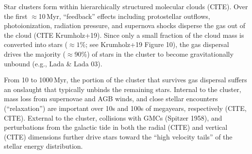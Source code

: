 \documentclass[12pt,twocolumn,tighten]{aastex63}
\begin{document}
Star clusters form within hierarchically structured molecular clouds
(CITE).  Over the first $\approx$10\,Myr, ``feedback'' effects
including protostellar outflows, photoionization, radiation pressure,
and supernova shocks disperse the gas out of the cloud (CITE
Krumholz+19).  Since only a small fraction of the cloud mass is
converted into stars ($\approx 1\%$; see Krumholz+19 Figure 10), the
gas dispersal drives the majority ($\approx$90\%) of stars in the
cluster to become gravitationally unbound (e.g., Lada \& Lada 03).

From 10 to 1000\,Myr, the portion of the cluster that survives gas
dispersal suffers an onslaught that typically unbinds the remaining stars.
Internal to the cluster, mass loss from supernovae and AGB winds, and
close stellar encounters (``relaxation'') are important over 10s and
100s of megayears, respectively (CITE, CITE).  External to the
cluster, collisions with GMCs (Spitzer 1958), and perturbations from
the galactic tide in both the radial (CITE) and vertical (CITE)
dimensions further drive stars toward the ``high velocity tails'' of
the stellar energy distribution.


% 
\end{document}
